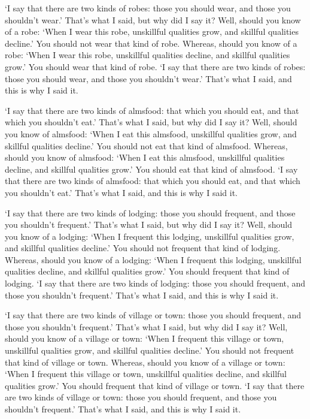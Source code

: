 \documentclass[12pt,openany]{book}%
\begin{document}
‘I say that there are two kinds of robes: those you should wear, and those you shouldn’t wear.’ That’s what I said, but why did I say it? Well, should you know of a robe: ‘When I wear this robe, unskillful qualities grow, and skillful qualities decline.’ You should not wear that kind of robe. Whereas, should you know of a robe: ‘When I wear this robe, unskillful qualities decline, and skillful qualities grow.’ You should wear that kind of robe. ‘I say that there are two kinds of robes: those you should wear, and those you shouldn’t wear.’ That’s what I said, and this is why I said it. 

‘I say that there are two kinds of almsfood: that which you should eat, and that which you shouldn’t eat.’ That’s what I said, but why did I say it? Well, should you know of almsfood: ‘When I eat this almsfood, unskillful qualities grow, and skillful qualities decline.’ You should not eat that kind of almsfood. Whereas, should you know of almsfood: ‘When I eat this almsfood, unskillful qualities decline, and skillful qualities grow.’ You should eat that kind of almsfood. ‘I say that there are two kinds of almsfood: that which you should eat, and that which you shouldn’t eat.’ That’s what I said, and this is why I said it. 

‘I say that there are two kinds of lodging: those you should frequent, and those you shouldn’t frequent.’ That’s what I said, but why did I say it? Well, should you know of a lodging: ‘When I frequent this lodging, unskillful qualities grow, and skillful qualities decline.’ You should not frequent that kind of lodging. Whereas, should you know of a lodging: ‘When I frequent this lodging, unskillful qualities decline, and skillful qualities grow.’ You should frequent that kind of lodging. ‘I say that there are two kinds of lodging: those you should frequent, and those you shouldn’t frequent.’ That’s what I said, and this is why I said it. 

‘I say that there are two kinds of village or town: those you should frequent, and those you shouldn’t frequent.’ That’s what I said, but why did I say it? Well, should you know of a village or town: ‘When I frequent this village or town, unskillful qualities grow, and skillful qualities decline.’ You should not frequent that kind of village or town. Whereas, should you know of a village or town: ‘When I frequent this village or town, unskillful qualities decline, and skillful qualities grow.’ You should frequent that kind of village or town. ‘I say that there are two kinds of village or town: those you should frequent, and those you shouldn’t frequent.’ That’s what I said, and this is why I said it. 
\end{document}
